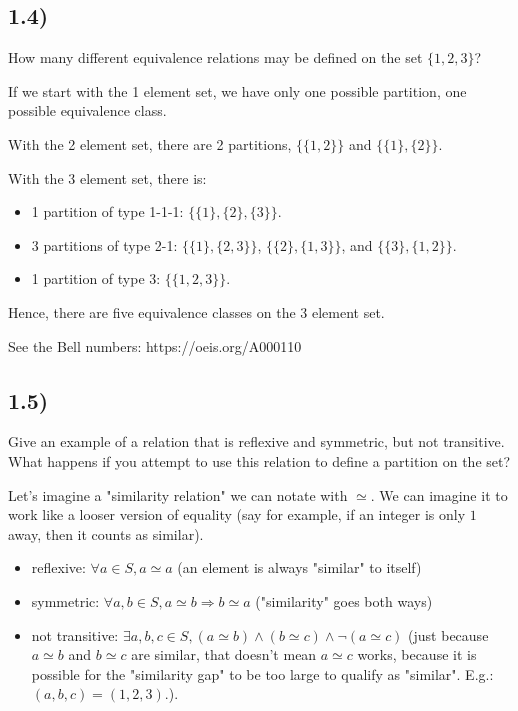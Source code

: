 \documentclass[12pt, letterpaper, twoside]{report}
\begin{document}
\subsection*{1.4)}

How many different equivalence relations may be defined on the set $\{1, 2, 3\}$?

If we start with the 1 element set, we have only one possible partition, one possible equivalence class.

With the 2 element set, there are 2 partitions, $\{\{1, 2\}\}$ and $\{\{1\}, \{2\}\}$.

With the 3 element set, there is:
\begin{itemize}
	\item 1 partition of type 1-1-1: $\{\{1\}, \{2\}, \{3\}\}$.
	\item 3 partitions of type 2-1: $\{\{1\}, \{2, 3\}\}$, $\{\{2\}, \{1, 3\}\}$, and $\{\{3\}, \{1, 2\}\}$.
	\item 1 partition of type 3: $\{\{1, 2, 3\}\}$.
\end{itemize}

Hence, there are five equivalence classes on the 3 element set.

See the Bell numbers: https://oeis.org/A000110



\subsection*{1.5)}

Give an example of a relation that is reflexive and symmetric, but not transitive. What happens if you attempt to use this relation to define a partition on the set?

Let's imagine a "similarity relation" we can notate with $\simeq$. We can imagine it to work like a looser version of equality (say for example, if an integer is only $1$ away, then it counts as similar).
\begin{itemize}
	\item reflexive: $\forall a \in S, a \simeq a$ (an element is always "similar" to itself)
	\item symmetric: $\forall a, b \in S, a \simeq b \Rightarrow b \simeq a$ ("similarity" goes both ways)
	\item not transitive: $\exists a, b, c \in S, (a \simeq b) \land (b \simeq c) \land \lnot (a \simeq c)$ (just because $a \simeq b$ and $b \simeq c$ are similar, that doesn't mean $a \simeq c$ works, because it is possible for the "similarity gap" to be too large to qualify as "similar". E.g.: $(a, b, c) = (1, 2, 3)$.).
\end{itemize}
\end{document}
